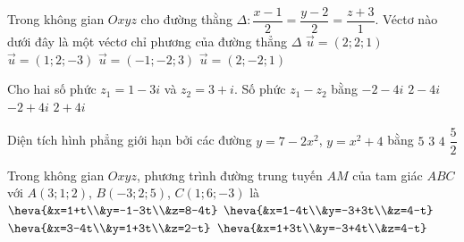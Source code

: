 \begin{ex}%
Trong không gian $Oxyz$ cho đường thằng $\Delta: \dfrac{x-1}{2}=\dfrac{y-2}{2}=\dfrac{z+3}{1}$. Véctơ nào dưới đây là một véctơ chỉ phương của đường thẳng $\Delta$
\choice
{\True $\overrightarrow{u}=\left( 2;2;1\right) $}
{$\overrightarrow{u}=\left( 1;2;-3\right) $}
{$\overrightarrow{u}=\left( -1;-2;3\right) $}
{$\overrightarrow{u}=\left( 2;-2;1 \right) $}
\end{ex}

\begin{ex}%
Cho hai số phức $z_1=1-3i$ và $z_2=3+i$. Số phức $z_1-z_2$ bằng
\choice
{\True $-2-4i$}
{$2-4i$}
{$-2+4i$}
{$2+4i$}
\end{ex}

\begin{ex}%
Diện tích hình phẳng giới hạn bởi các đường $ y=7-2x^2$, $ y=x^2+4$ bằng
\choice
{$5$}
{$3$}
{\True $4$}
{$\dfrac{5}{2}$}
\end{ex}

\begin{ex}%
Trong không gian $Oxyz$, phương trình đường trung tuyến $AM$ của tam giác $ABC$ với $A(3;1;2)$, $B(-3;2;5)$, $C(1;6;-3)$ là
\choice
{$\heva{&x=1+t\\&y=-1-3t\\&z=8-4t}$}
{$\heva{&x=1-4t\\&y=-3+3t\\&z=4-t}$}
{\True $\heva{&x=3-4t\\&y=1+3t\\&z=2-t}$}
{$\heva{&x=1+3t\\&y=-3+4t\\&z=4-t}$}
\end{ex}

